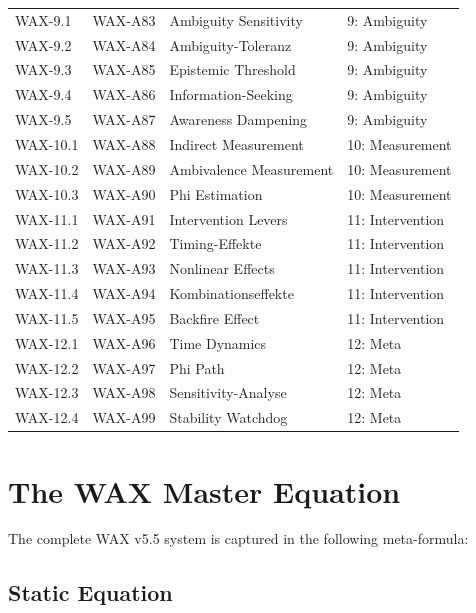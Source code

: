 \begin{longtable}{@{}llll@{}}
WAX-9.1 & WAX-A83 & Ambiguity Sensitivity & 9: Ambiguity \\
WAX-9.2 & WAX-A84 & Ambiguity-Toleranz & 9: Ambiguity \\
WAX-9.3 & WAX-A85 & Epistemic Threshold & 9: Ambiguity \\
WAX-9.4 & WAX-A86 & Information-Seeking & 9: Ambiguity \\
WAX-9.5 & WAX-A87 & Awareness Dampening & 9: Ambiguity \\
\midrule

WAX-10.1 & WAX-A88 & Indirect Measurement & 10: Measurement \\
WAX-10.2 & WAX-A89 & Ambivalence Measurement & 10: Measurement \\
WAX-10.3 & WAX-A90 & Phi Estimation & 10: Measurement \\
\midrule

WAX-11.1 & WAX-A91 & Intervention Levers & 11: Intervention \\
WAX-11.2 & WAX-A92 & Timing-Effekte & 11: Intervention \\
WAX-11.3 & WAX-A93 & Nonlinear Effects & 11: Intervention \\
WAX-11.4 & WAX-A94 & Kombinationseffekte & 11: Intervention \\
WAX-11.5 & WAX-A95 & Backfire Effect & 11: Intervention \\
\midrule

WAX-12.1 & WAX-A96 & Time Dynamics & 12: Meta \\
WAX-12.2 & WAX-A97 & Phi Path & 12: Meta \\
WAX-12.3 & WAX-A98 & Sensitivity-Analyse & 12: Meta \\
WAX-12.4 & WAX-A99 & Stability Watchdog & 12: Meta \\

\end{longtable}

\section{The WAX Master Equation}
\label{sec:av-master-equation}

The complete WAX v5.5 system is captured in the following meta-formula:

\subsection{Static Equation}

